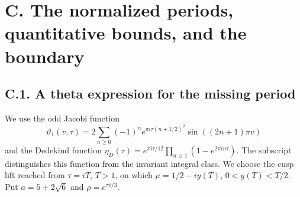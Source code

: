 \section{C. The normalized periods, quantitative bounds, and the boundary}

\subsection{C.1. A theta expression for the missing period}
We use the odd Jacobi function
\[
 \vartheta_1(v,\tau)=2\sum_{n\geq0}(-1)^n
 e^{\pi i\tau(n+1/2)^2}\sin((2n+1)\pi v)
\]
and the Dedekind function
\(\eta_D(\tau)=e^{\pi i\tau/12}\prod_{n\geq1}(1-e^{2\pi in\tau})\).
The subscript distinguishes this function from the invariant integral class.
We choose the cusp lift reached from \(\tau=iT\), \(T>1\), on which
\(\mu=1/2-iy(T)\), \(0<y(T)<T/2\). Put
\(a=5+2\sqrt6\) and \(\rho=e^{\pi i/3}\).

